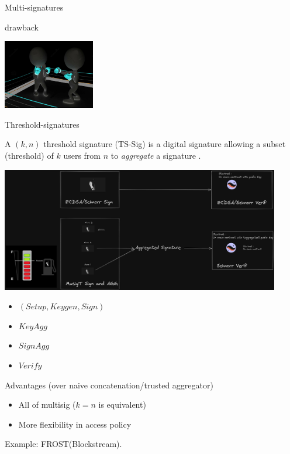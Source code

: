 \documentclass[aspectratio=43]{beamer}
\begin{document}
\begin{frame}{Multi-signatures}
{\begin{alertblock}{drawback}
\begin{itemize}
\begin{center}
  \includegraphics[width=4cm]{images/rounds.jpg}
  \end{center}
  \end{itemize}
  \end{alertblock}
  } 
 
 \end{frame}
 

 
\begin{frame}{Threshold-signatures}


 A $(k,n)$ threshold signature (TS-Sig) is a digital signature allowing a subset (threshold) of $k$ users from $n$ to {\it aggregate} a signature . 
 
  {
   \begin{center}
        \includegraphics[width=12.2cm]{images/threshold.png}
        \end{center}
  }
  {
   \begin{itemize}
     \item $(Setup, Keygen, Sign)$
     \item $KeyAgg$
     \item $SignAgg$
     \item $Verify$
   \end{itemize}
     
      {
      
  \begin{exampleblock}{Advantages (over naive concatenation/trusted aggregator)}
  \begin{itemize}
  \item All of multisig ($k=n$ is equivalent)
  \item More flexibility in access policy
  \end{itemize}
  \end{exampleblock}
 
  } 
   Example: FROST(Blockstream).
 }
\end{frame}
\end{document}
